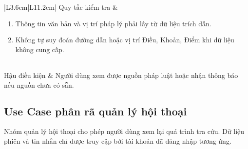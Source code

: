 \documentclass[12pt,a4paper,oneside]{report}
\begin{document}
{\begin{longtable}{|L{3.6cm}|L{11.2cm}|}
    \hline
    Quy tắc kiểm tra    & \begin{enumerate}[leftmargin=*,nosep]
                            \item Thông tin văn bản và vị trí pháp lý phải lấy từ dữ liệu trích dẫn.
                            \item Không tự suy đoán đường dẫn hoặc vị trí Điều, Khoản, Điểm khi dữ liệu không cung cấp.
                          \end{enumerate}        \\
    \hline
    Hậu điều kiện       & Người dùng xem được nguồn pháp luật hoặc nhận thông báo nếu nguồn chưa có sẵn.                    \\
    \hline
  \end{longtable}
}

\subsection{Use Case phân rã quản lý hội thoại}
Nhóm quản lý hội thoại cho phép người dùng xem lại quá trình tra cứu. Dữ liệu phiên và tin nhắn chỉ được truy cập bởi tài khoản đã đăng nhập tương ứng.
\end{document}
